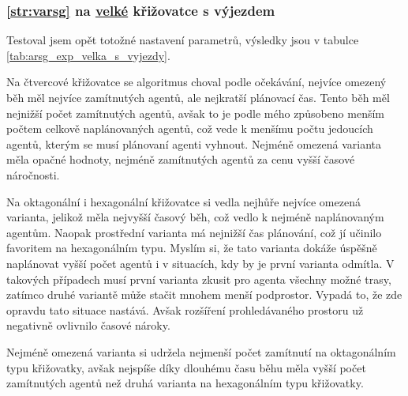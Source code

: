 

\subsubsection{\ref{str:varsg} na \hyperref[par:data_velka]{velké} křižovatce s výjezdem}
\label{subsubsec:exp_arsg_velka_krizovatka_s_vyjezdem}

Testoval jsem opět totožné nastavení parametrů, výsledky jsou v tabulce \ref{tab:arsg_exp_velka_s_vyjezdy}.

Na čtvercové křižovatce se algoritmus choval podle očekávání, nejvíce omezený běh měl nejvíce zamítnutých agentů,
ale nejkratší plánovací čas.
Tento běh měl nejnižší počet zamítnutých agentů,
avšak to je podle mého způsobeno menším počtem celkově naplánovaných agentů,
což vede k menšímu počtu jedoucích agentů, kterým se musí plánovaní agenti vyhnout.
Nejméně omezená varianta měla opačné hodnoty, nejméně zamítnutých agentů za cenu vyšší časové náročnosti.

Na oktagonální i hexagonální křižovatce si vedla nejhůře nejvíce omezená varianta,
jelikož měla nejvyšší časový běh, což vedlo k nejméně naplánovaným agentům.
Naopak prostřední varianta má nejnižší čas plánování, což jí učinilo favoritem na hexagonálním typu.
Myslím si, že tato varianta dokáže úspěšně naplánovat vyšší počet agentů i v situacích,
kdy by je první varianta odmítla.
V takových případech musí první varianta zkusit pro agenta všechny možné trasy,
zatímco druhé variantě může stačit mnohem menší podprostor.
Vypadá to, že zde opravdu tato situace nastává.
Avšak rozšíření prohledávaného prostoru už negativně ovlivnilo časové nároky.

Nejméně omezená varianta si udržela nejmenší počet zamítnutí na oktagonálním typu křižovatky,
avšak nejspíše díky dlouhému času běhu měla vyšší počet zamítnutých agentů
než druhá varianta na hexagonálním typu křižovatky.




